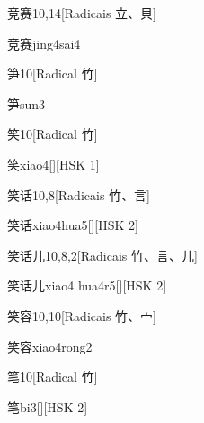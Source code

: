\begin{entry}{竞赛}{10,14}[Radicais ⽴、⾙]
  \begin{phonetics}{竞赛}{jing4sai4}
  \end{phonetics}
\end{entry}

\begin{entry}{笋}{10}[Radical ⽵]
  \begin{phonetics}{笋}{sun3}
  \end{phonetics}
\end{entry}

\begin{entry}{笑}{10}[Radical ⽵]
  \begin{phonetics}{笑}{xiao4}[][HSK 1]
  \end{phonetics}
\end{entry}

\begin{entry}{笑话}{10,8}[Radicais ⽵、⾔]
  \begin{phonetics}{笑话}{xiao4hua5}[][HSK 2]
  \end{phonetics}
\end{entry}

\begin{entry}{笑话儿}{10,8,2}[Radicais ⽵、⾔、⼉]
  \begin{phonetics}{笑话儿}{xiao4 hua4r5}[][HSK 2]
  \end{phonetics}
\end{entry}

\begin{entry}{笑容}{10,10}[Radicais ⽵、⼧]
  \begin{phonetics}{笑容}{xiao4rong2}
  \end{phonetics}
\end{entry}

\begin{entry}{笔}{10}[Radical ⽵]
  \begin{phonetics}{笔}{bi3}[][HSK 2]
  \end{phonetics}
\end{entry}

